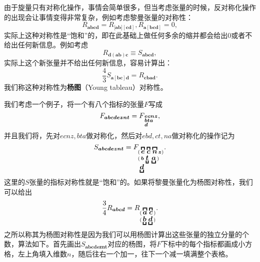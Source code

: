 由于旋量只有对称化操作，事情会简单很多，但当考虑张量的时候，反对称化操作的出现会让事情变得非常复杂，例如考虑黎曼张量的对称性：
\begin{equation*}
	R_{\boldsymbol{abcd}} =R_{[\boldsymbol{ab]}[\boldsymbol{cd}]} ,R_{\boldsymbol{a}[\boldsymbol{bcd}]} =0,
\end{equation*}
实际上这种对称性是“饱和”的，即在此基础上做任何多余的缩并都会给出$0$或者不给出任何新信息。例如考虑
\begin{equation*}
	R_{\boldsymbol{d}(\boldsymbol{ab})\boldsymbol{c}} \equiv S_{\boldsymbol{abcd}} ,
\end{equation*}
实际上这个新张量并不给出任何新信息，容易计算出：
\begin{equation*}
	\frac{4}{3} S_{\boldsymbol{a[ bc] d}} =R_{\boldsymbol{cbad}} .
\end{equation*}
我们称这种对称性为\textbf{杨图}（Young tableau）对称性。



我们考虑一个例子，将一个有八个指标的张量$F$写成
\begin{equation*}
	F_{\boldsymbol{abcdeznt}} =F\boldsymbol{_{ \begin{subarray}{l}
				ecnz\\
				bta\\
				d
	\end{subarray}}} ,
\end{equation*}
并且我们将，先对$ecnz,bta$做对称化，然后对$ebd,ct,na$做对称化的操作记为
\begin{equation*}
	S_{\boldsymbol{abcdeznt}} =F_{ \begin{subarray}{l}
			(\thinspace\overbracket{\boldsymbol{e}}\thinspace\overbracket{\boldsymbol{c}}\thinspace\overbracket{\boldsymbol{n}} \boldsymbol{z})\\
			( \thinspace \boldsymbol{b} \thinspace\underbracket{\boldsymbol{t}} \thinspace \thinspace\underbracket{\boldsymbol{a}}\thinspace )\\
			\thinspace\thinspace \underbracket{\boldsymbol{d}}
	\end{subarray}} .
\end{equation*}
这里的$S$张量的指标对称性就是“饱和”的。如果将黎曼张量化为杨图对称性，我们可以给出
\begin{equation}
	\frac{3}{4} R_{\boldsymbol{abcd}} =R_{ \begin{subarray}{l}
			(\thinspace\overbracket{\boldsymbol{a}}\thinspace\overbracket{\boldsymbol{c}}\thinspace)\\
			(\thinspace\underbracket{\boldsymbol{b}}\thinspace \underbracket{\boldsymbol{d}}\thinspace )
	\end{subarray}} .
	\label{eq:4.19}
\end{equation}
之所以称其为杨图对称性是因为我们可以用杨图计算出这些张量的独立分量的个数，算法如下。首先画出$S_{\boldsymbol{abcdeznt}}$对应的杨图，将$F$下标中的每个指标都画成小方格，左上角填入维数$n$，随后往右一个加一，往下一个减一填满整个表格。

